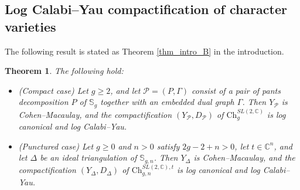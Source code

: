 \documentclass[12pt,letterpaper, reqno]{amsart}
\newtheorem{theorem}{Theorem}[section]
\theoremstyle{defstyle} \newtheorem{definition}[theorem]{Definition}
\theoremstyle{remark}
\numberwithin{equation}{section}
\numberwithin{figure}{section}
\newcommand{\CC} {\mathbb{C}}
\newcommand{\bS} {\mathbb{S}}
\newcommand{\cP} {\mathcal{P}}
\begin{document}
\subsection{Log Calabi--Yau compactification of character varieties}
\label{sec_lcy_character}

The following result is stated as Theorem \ref{thm_intro_B} in the introduction. 

\begin{theorem}
\label{thm_main_B}
 The following hold:
\begin{itemize}
\item[(i)] \emph{(Compact case)}
Let $g\geq 2$, and let $\cP=(P,\Gamma)$ consist of a pair of pants decomposition $P$ of $\bS_g$ together with an embedded dual graph $\Gamma$. Then $Y_\cP$ is Cohen--Macaulay, and the compactification $(Y_\cP,D_\cP)$ of $\mathrm{Ch}_g^{SL(2,\CC)}$ is log canonical and log Calabi--Yau.

\item[(ii)] \emph{(Punctured case)}
Let $g\geq 0$ and $n>0$ satisfy $2g-2+n>0$, let $t\in\CC^n$, and let $\Delta$ be an ideal triangulation of $\bS_{g,n}$. Then
 $Y_\Delta$ is Cohen--Macaulay, and the compactification $(Y_\Delta,D_\Delta)$ of $\mathrm{Ch}_{g,n}^{SL(2,\CC),t}$ is log canonical and log Calabi--Yau.
\end{itemize}
\end{theorem}
\end{document}
